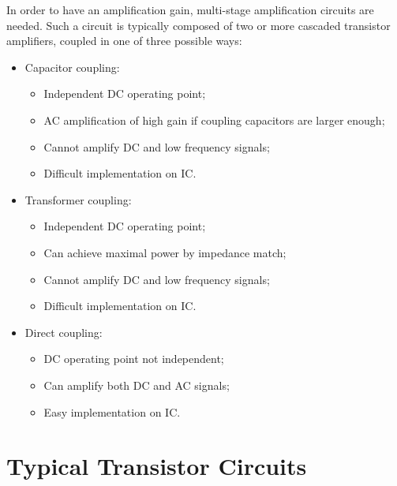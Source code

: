 In order to have an amplification gain, multi-stage amplification circuits
are needed. Such a circuit is typically composed of two or more cascaded
transistor amplifiers, coupled in one of three possible ways:
\begin{itemize}
\item Capacitor coupling:
	\begin{itemize}
	\item Independent DC operating point;
	\item AC amplification of high gain if coupling capacitors are
		larger enough;
	\item Cannot amplify DC and low frequency signals;
	\item Difficult implementation on IC.
	\end{itemize}

\item Transformer coupling:
	\begin{itemize}
	\item Independent DC operating point;
	\item Can achieve maximal power by impedance match;
	\item Cannot amplify DC and low frequency signals;
	\item Difficult implementation on IC.
	\end{itemize}

\item Direct coupling:
	\begin{itemize}
	\item DC operating point not independent;
	\item Can amplify both DC and AC signals;
	\item Easy implementation on IC.
	\end{itemize}

\end{itemize}


\section*{Typical Transistor Circuits}

